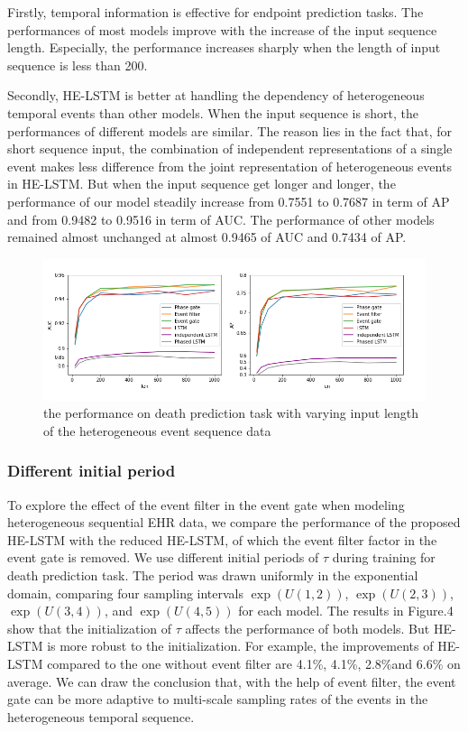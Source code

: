 \documentclass[letterpaper]{article} %
\begin{document}
Firstly, temporal information is effective for endpoint prediction tasks. The performances of most models improve with the increase of the input sequence length. Especially, the performance increases sharply when the length of input sequence is less than 200.

Secondly, HE-LSTM is better at handling the dependency of heterogeneous temporal events than other models.
When the input sequence is short, the performances of different models are similar. The reason lies in the fact that, for short sequence input, the combination of independent representations of a single event makes less difference from the joint representation of heterogeneous events in HE-LSTM.
But when the input sequence get longer and longer, the performance of our model steadily increase from 0.7551 to 0.7687 in term of AP and from 0.9482 to 0.9516 in term of AUC. The performance of other models remained almost unchanged at almost 0.9465 of AUC and 0.7434 of AP.

\begin{figure}[!t]
\centering
\includegraphics[width=1.1\linewidth]{differ_len.png}

\caption{the performance on death prediction task with varying input length of the heterogeneous event sequence data }

\label{fig:length}
\end{figure}







\subsubsection{Different initial period}

To explore the effect of the event filter in the event gate when modeling heterogeneous sequential EHR data, we compare the performance of the proposed HE-LSTM with the reduced HE-LSTM, of which the event filter factor in the event gate is removed.
We use different initial periods of $\tau$ during training for death prediction task.
The period  was drawn uniformly in the exponential
domain, comparing four sampling intervals $\exp(U(1, 2))$, $\exp(U(2, 3))$, $\exp(U(3, 4))$, and
$\exp(U(4, 5))$ for each model.
The results in Figure.4 show that the initialization of $\tau$ affects the performance of both models. But HE-LSTM is more robust to the initialization. For example, the improvements of HE-LSTM compared to the one without event filter are 4.1\%, 4.1\%, 2.8\%and 6.6\% on average.
We can draw the conclusion that, with the help of event filter, the event gate can be more adaptive to multi-scale sampling rates of the events in the heterogeneous temporal sequence.
\end{document}
